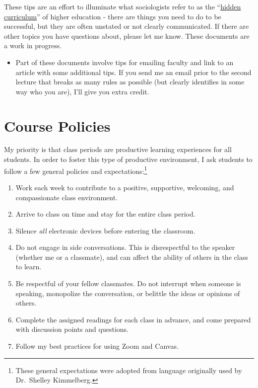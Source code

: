 \documentclass[
]{book}
\providecommand{\tightlist}{%
  \setlength{\itemsep}{0pt}\setlength{\parskip}{0pt}}
\newenvironment{rmdblock}[1]
  {\begin{shaded*}
  \begin{itemize}
  \renewcommand{\labelitemi}{
    \raisebox{-.7\height}[0pt][0pt]{
      {\setkeys{Gin}{width=3em,keepaspectratio}\texttt{[image: images/\#1]}}
    }
  }
  \item
  }
  {
  \end{itemize}
  \end{shaded*}
  }
\newenvironment{rmdnote}
  {\begin{rmdblock}{note}}
  {\end{rmdblock}}
\begin{document}
These tips are an effort to illuminate what sociologists refer to as the ``\href{https://books.google.com/books?hl=en\&lr=\&id=5r-TAgAAQBAJ\&oi=fnd\&pg=PP1\&dq=hidden+curriculum\#v=onepage\&q=hidden\%20curriculum\&f=false}{hidden curriculum}'' of higher education - there are things you need to do to be successful, but they are often unstated or not clearly communicated. If there are other topics you have questions about, please let me know. These documents are a work in progress.

\begin{rmdnote}
Part of these documents involve tips for emailing faculty and link to an
article with some additional tips. If you send me an email prior to the
second lecture that breaks as many rules as possible (but clearly
identifies in some way who you are), I'll give you extra credit.
\end{rmdnote}

\hypertarget{course-policies}{%
\chapter{Course Policies}\label{course-policies}}

My priority is that class periods are productive learning experiences for all students. In order to foster this type of productive environment, I ask students to follow a few general policies and expectations:\footnote{These general expectations were adopted from language originally used by Dr.~Shelley Kimmelberg.}

\begin{enumerate}
\def\labelenumi{\arabic{enumi}.}
\tightlist
\item
  Work each week to contribute to a positive, supportive, welcoming, and compassionate class environment.
\item
  Arrive to class on time and stay for the entire class period.
\item
  Silence \emph{all} electronic devices before entering the classroom.
\item
  Do not engage in side conversations. This is disrespectful to the speaker (whether me or a classmate), and can affect the ability of others in the class to learn.
\item
  Be respectful of your fellow classmates. Do not interrupt when someone is speaking, monopolize the conversation, or belittle the ideas or opinions of others.
\item
  Complete the assigned readings for each class in advance, and come prepared with discussion points and questions.
\item
  Follow my best practices for using Zoom and Canvas.
\end{enumerate}
\end{document}
